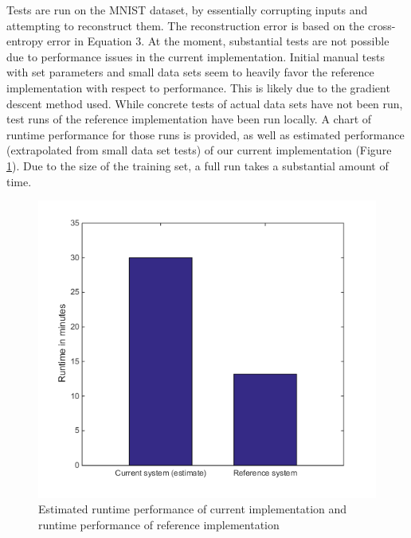 \documentclass{sig-alternate}
\begin{document}
Tests are run on the MNIST dataset, by essentially corrupting inputs and 
attempting to reconstruct them. 
The reconstruction error is based on the cross-entropy error in Equation 3. 
At the moment, substantial tests are not possible due to performance issues in the current 
implementation. Initial manual tests with set parameters and small data sets seem to heavily favor 
the reference implementation with respect to performance. This is likely due to the gradient descent
method used. While concrete tests of actual data sets have not 
been run, test runs of the reference implementation have been run locally. A chart of runtime
performance for those runs is provided, as well as estimated performance (extrapolated from
small data set tests) of our current 
implementation (Figure \ref{fig:performance}). Due to the size
of the training set, a full run takes a substantial amount
of time. 

\begin{figure}[h]
	\begin{center}
		\includegraphics[width=1\linewidth]{performance.png}
	\end{center}
	\vspace{-12pt}
	\caption{Estimated runtime performance of current implementation and runtime performance of reference implementation}
	\label{fig:performance}
\end{figure}
\end{document}

